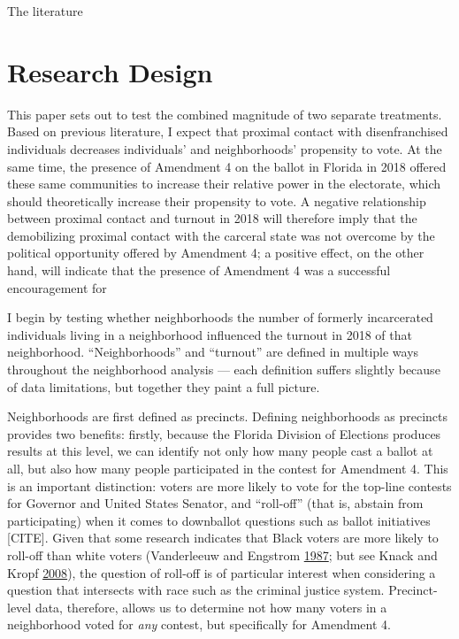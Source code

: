 \documentclass[
  12pt,
]{article}
\begin{document}
The literature

\hypertarget{research-design}{%
\section*{Research Design}\label{research-design}}

This paper sets out to test the combined magnitude of two separate treatments. Based on previous literature, I expect that proximal contact with disenfranchised individuals decreases individuals' and neighborhoods' propensity to vote. At the same time, the presence of Amendment 4 on the ballot in Florida in 2018 offered these same communities to increase their relative power in the electorate, which should theoretically increase their propensity to vote. A negative relationship between proximal contact and turnout in 2018 will therefore imply that the demobilizing proximal contact with the carceral state was not overcome by the political opportunity offered by Amendment 4; a positive effect, on the other hand, will indicate that the presence of Amendment 4 was a successful encouragement for

I begin by testing whether neighborhoods the number of formerly incarcerated individuals living in a neighborhood influenced the turnout in 2018 of that neighborhood. ``Neighborhoods'' and ``turnout'' are defined in multiple ways throughout the neighborhood analysis --- each definition suffers slightly because of data limitations, but together they paint a full picture.

Neighborhoods are first defined as precincts. Defining neighborhoods as precincts provides two benefits: firstly, because the Florida Division of Elections produces results at this level, we can identify not only how many people cast a ballot at all, but also how many people participated in the contest for Amendment 4. This is an important distinction: voters are more likely to vote for the top-line contests for Governor and United States Senator, and ``roll-off'' (that is, abstain from participating) when it comes to downballot questions such as ballot initiatives {[}CITE{]}. Given that some research indicates that Black voters are more likely to roll-off than white voters (Vanderleeuw and Engstrom \protect\hyperlink{ref-Vanderleeuw1987}{1987}; but see Knack and Kropf \protect\hyperlink{ref-Knack2008}{2008}), the question of roll-off is of particular interest when considering a question that intersects with race such as the criminal justice system. Precinct-level data, therefore, allows us to determine not how many voters in a neighborhood voted for \emph{any} contest, but specifically for Amendment 4.
\end{document}
